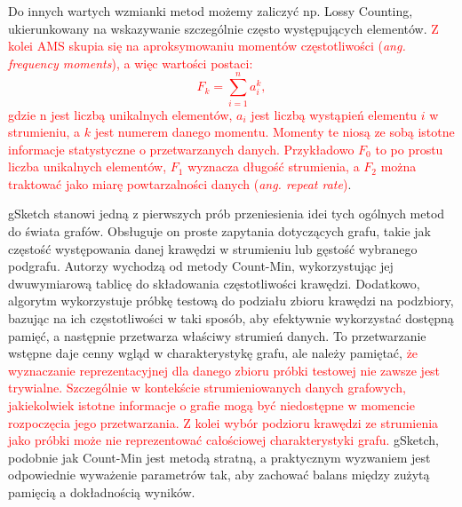     Do innych wartych wzmianki metod możemy zaliczyć np. Lossy Counting\cite{Manku_Motwani_2012}, ukierunkowany na wskazywanie szczególnie często występujących elementów. \textcolor{red}{Z kolei AMS\cite{Alon_Matias_Szegedy_1996} skupia się na aproksymowaniu momentów częstotliwości (\emph{ang. frequency moments}), a więc wartości postaci:
    \[
        F_k = \sum\limits_{i = 1}^{n} a_i^k,
    \]
    gdzie n jest liczbą unikalnych elementów, $a_i$ jest liczbą wystąpień elementu $i$ w strumieniu, a $k$ jest numerem danego momentu. Momenty te niosą ze sobą istotne informacje statystyczne o przetwarzanych danych. Przykładowo $F_0$ to po prostu liczba unikalnych elementów, $F_1$ wyznacza długość strumienia, a $F_2$ można traktować jako miarę powtarzalności danych (\emph{ang. repeat rate})\cite{Good_1982}}. 
    
    gSketch\cite{Zhao_Aggarwal_Wang_2011} stanowi jedną z pierwszych prób przeniesienia idei tych ogólnych metod do świata grafów. Obsługuje on proste zapytania dotyczących grafu, takie jak częstość występowania danej krawędzi w strumieniu lub gęstość wybranego podgrafu. Autorzy wychodzą od metody Count-Min, wykorzystując jej dwuwymiarową tablicę do składowania częstotliwości krawędzi. Dodatkowo, algorytm wykorzystuje próbkę testową do podziału zbioru krawędzi na podzbiory, bazując na ich częstotliwości w taki sposób, aby efektywnie wykorzystać dostępną pamięć, a następnie przetwarza właściwy strumień danych. To przetwarzanie wstępne daje cenny wgląd w charakterystykę grafu, ale należy pamiętać, \textcolor{red}{że wyznaczanie reprezentacyjnej dla danego zbioru próbki testowej nie zawsze jest trywialne. Szczególnie w kontekście strumieniowanych danych grafowych, jakiekolwiek istotne informacje o grafie mogą być niedostępne w momencie rozpoczęcia jego przetwarzania. Z kolei wybór podzioru krawędzi ze strumienia jako próbki może nie reprezentować całościowej charakterystyki grafu.} gSketch, podobnie jak Count-Min jest metodą stratną, a praktycznym wyzwaniem jest odpowiednie wyważenie parametrów tak, aby zachować balans między zużytą pamięcią a dokładnością wyników.
    
